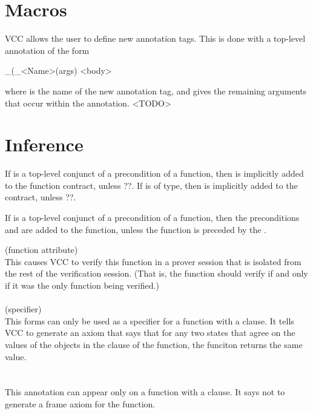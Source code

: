 \documentclass[preprint,nocopyrightspace]{sigplanconf}
\begin{document}
{{\section{Macros}
VCC allows the user to define new annotation tags. This is done with
a top-level annotation of the form
\begin{VCC}
_(\bool \macro_<Name>(args) {
  <body>
}
\end{VCC}
where  is the name of the new annotation tag,
and  gives the remaining arguments that occur within the
annotation. <TODO>

\section{Inference}

If  is a top-level conjunct of a precondition of a
function, then   is implicitly added
to the function contract, unless ??. If  is of \vcc{\claim}
type, then  is implicitly added to
the contract, unless ??.

If  is a top-level conjunct of a
precondition of a function, then the
preconditions 
and  are added to the
function, unless the function is preceded by the .


 (function attribute)\\
This causes VCC to verify this function in a prover session that is
isolated from the rest of the verification session. (That is, the
function should verify if and only if it was the only function being verified.)
\\\\
 (specifier)\\
This forms can only be used as a specifier for a   function
with a  clause. It tells VCC to generate an axiom that says
that for any two states that agree on the values of the objects in the
 clause of the function, the funciton returns the same
value.
\\\\
\\
This annotation can appear only on a  function with
a  clause. It says not to generate a frame axiom for the
function. 



}}
\end{document}
